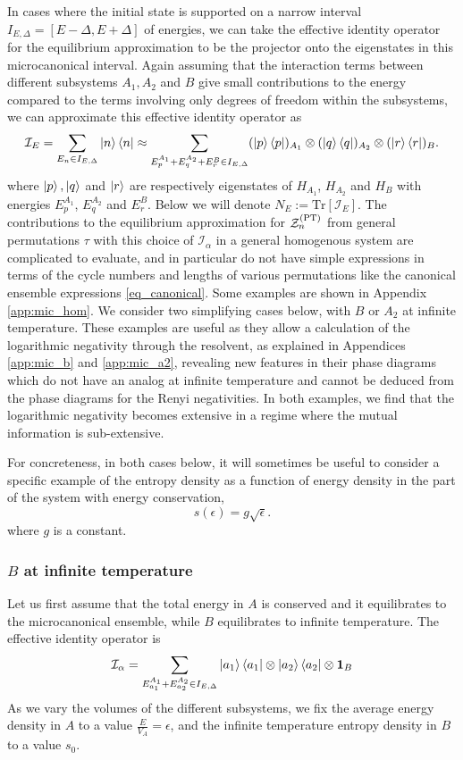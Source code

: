\documentclass[a4paper,11pt]{article}
\newcommand{\be}{\begin{equation}}
\newcommand{\ee}{\end{equation}}
\newcommand\al{{\alpha}}
\newcommand\sI{{\ensuremath{{\mathcal I}}}}
\newcommand\sZ{{\mathcal Z}}
\begin{document}
\begin{enumerate}
In cases where the initial state is supported on a narrow interval $I_{E, \Delta} = [E- \Delta, E+\Delta]$ of energies, we can take the effective identity operator for the equilibrium approximation to be the projector onto the eigenstates in this microcanonical interval. Again assuming that the interaction terms between different subsystems $A_1, A_2$ and $B$ give small contributions to the energy compared to the terms involving only degrees of freedom within the subsystems, we can approximate this effective identity operator as 
\be 
\sI_{E} = \sum_{E_n \in I_{E, \Delta}} \ket{n}\bra{n} \approx \sum_{E_p^{A_1}+E_q^{A_2}+E_r^{B}\in I_{E, \Delta}} (\ket{p}\bra{p})_{A_1} \otimes (\ket{q}\bra{q})_{A_2} \otimes (\ket{r}\bra{r})_{B}. 
\label{full_mic}
\ee
where $\ket{p}, \ket{q}$ and $\ket{r}$ are respectively eigenstates of $H_{A_1}$, $H_{A_2}$ and $H_B$ with energies $E_p^{A_1}$, $E_q^{A_2}$ and $E_r^{B}$. Below we will denote $N_E := \text{Tr}[\sI_{E}]$. 
The contributions to the equilibrium approximation for $\sZ_n^{(\rm PT)}$ from general permutations $\tau$ with this choice of $\sI_{\alpha}$ in a general homogenous system are complicated to evaluate, and in particular do not have simple expressions in terms of the cycle numbers and lengths of various permutations like the canonical ensemble expressions \eqref{eq_canonical}. Some examples are shown in Appendix \ref{app:mic_hom}. We consider two simplifying cases below, with $B$ or $A_2$ at infinite temperature. 
These examples are useful as they allow a calculation of the logarithmic negativity through the resolvent, as explained in Appendices \ref{app:mic_b} and \ref{app:mic_a2}, revealing new features in their phase diagrams which do not have an analog at infinite temperature and cannot be deduced from the phase diagrams for the Renyi negativities. In both examples, we find that the logarithmic negativity becomes extensive in a regime where the mutual information is sub-extensive.

For concreteness, in both cases below, it will sometimes be useful to consider a specific example of the entropy density as a function of energy density in the part of the system with energy conservation, 
\be 
s(\epsilon) = g \sqrt{\epsilon}. 
\label{s_half}
\ee
where $g$ is a constant.

\subsubsection{$B$ at infinite temperature} 

Let us first assume that the total energy in $A$ is conserved and it equilibrates to the microcanonical ensemble, while $B$ equilibrates to infinite temperature. The effective identity operator is 
\be \label{mic_case1}
\sI_{\al} = \sum_{E^{A_1}_{a_1} + E^{A_2}_{a_2} \in I_{E, \Delta}} \ket{a_1}\bra{a_1} \otimes \ket{a_2}\bra{a_2} \otimes \mathbf{1}_B 
\ee
As we vary the volumes of the different subsystems, we fix the average energy density in $A$ to a value $\frac{E}{V_A} = \epsilon$, and the infinite temperature entropy density in $B$ to a value $s_0$. 


\end{enumerate}
\end{document}
